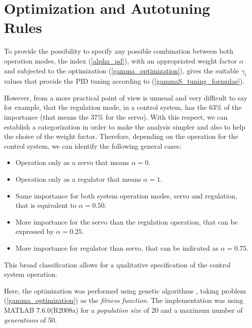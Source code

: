 %
\section{Optimization and Autotuning Rules}
\label{autotuning}
%

To provide the possibility to specify any possible combination
between both operation modes, the index (\ref{alpha_pd}), with an
appropriated weight factor $\alpha$ and subjected to the
optimization (\ref{gamma_optimization}), gives the suitable
$\gamma_i$ values that provide the PID tuning according to
(\ref{gammaS_tuning_formulae}).

However, from a more practical point of view is unusual and very
difficult to say for example, that the regulation mode, in a
control system, has the 63\% of the importance (that means the
37\% for the servo). With this respect, we can establish a
categorization in order to make the analysis simpler and also to
help the choice of the weight factor. Therefore, depending on the
operation for the control system, we can identify the following
general cases:

\begin{itemize}

\item Operation only as a servo that means $\alpha=0$.

\item Operation only as a regulator that means $\alpha=1$.

\item Same importance for both system operation modes, servo and
regulation, that is equivalent to $\alpha=0.50$.

\item More importance for the servo than the regulation operation,
that can be expressed by $\alpha=0.25$.

\item More importance for regulator than servo, that can be
indicated as $\alpha=0.75$.

\end{itemize}

This broad classification allows for a qualitative specification
of the control system operation.

Here, the optimization was performed using genetic algorithms
\citep{mitchell1998}, taking problem (\ref{gamma_optimization}) as
the \emph{fitness function}. The implementation was using MATLAB
7.6.0(R2008a)\textregistered{ } for a \emph{population size} of 20
and a maximum number of \emph{generations} of 50.

